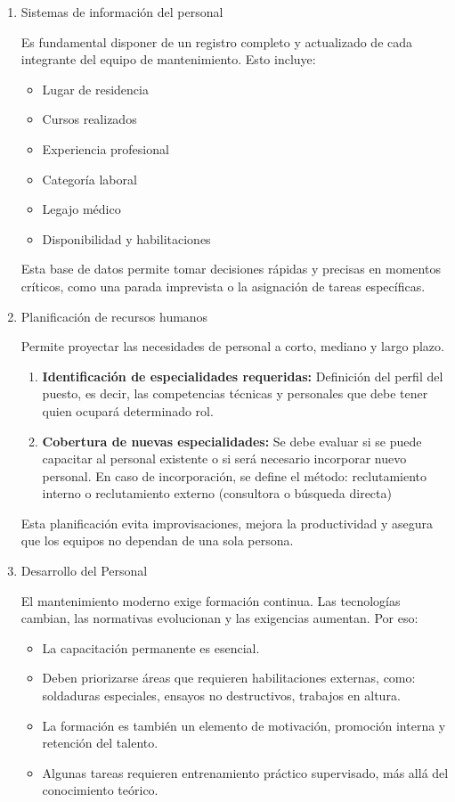 \documentclass[a4paper,oneside,11pt]{article}
\begin{document}
\begin{enumerate}
    \item Sistemas de información del personal

    Es fundamental disponer de un registro completo y actualizado de cada integrante del equipo de mantenimiento. Esto incluye:
    \begin{itemize}
        \item Lugar de residencia
        \item Cursos realizados
        \item Experiencia profesional
        \item Categoría laboral
        \item Legajo médico
        \item Disponibilidad y habilitaciones
    \end{itemize}
    Esta base de datos permite tomar decisiones rápidas y precisas en momentos críticos, como una parada imprevista o la asignación de tareas específicas.

    \item Planificación de recursos humanos

    Permite proyectar las necesidades de personal a corto, mediano y largo plazo.
    \begin{enumerate}
        \item \textbf{Identificación de especialidades requeridas:} Definición del perfil del puesto, es decir, las competencias técnicas y personales que debe tener quien ocupará determinado rol.

        \item \textbf{Cobertura de nuevas especialidades:} Se debe evaluar si se puede capacitar al personal existente o si será necesario incorporar nuevo personal. En caso de incorporación, se define el método: reclutamiento interno o reclutamiento externo (consultora o búsqueda directa)
    \end{enumerate}
    Esta planificación evita improvisaciones, mejora la productividad y asegura que los equipos no dependan de una sola persona.

    \item Desarrollo del Personal

    El mantenimiento moderno exige formación continua. Las tecnologías cambian, las normativas evolucionan y las exigencias aumentan. Por eso:
    \begin{itemize}
        \item La capacitación permanente es esencial.
        \item Deben priorizarse áreas que requieren habilitaciones externas, como: soldaduras especiales, ensayos no destructivos, trabajos en altura.
        \item La formación es también un elemento de motivación, promoción interna y retención del talento.
        \item Algunas tareas requieren entrenamiento práctico supervisado, más allá del conocimiento teórico.
    \end{itemize}
\end{enumerate}
\end{document}

